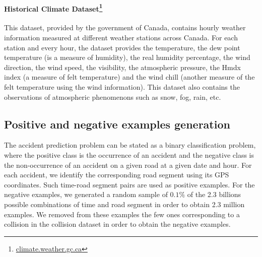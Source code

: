 \documentclass[conference]{IEEEtran}
\begin{document}
\paragraph{Historical Climate Dataset\protect\footnote{\url{climate.weather.gc.ca}}}

This dataset, provided by the government of Canada, contains hourly weather
information measured at different weather stations across Canada. For each
station and every hour, the dataset provides the temperature, the dew point
temperature (is a measure of humidity), the real humidity percentage,
the wind direction, the wind speed, the visibility, the atmospheric pressure,
the Hmdx index (a measure of felt temperature) and the wind chill 
 (another measure of the felt temperature using the wind information).
This dataset also contains the observations of atmospheric phenomenons such
as snow, fog, rain, etc.

\subsection{Positive and negative examples generation}

The accident prediction problem can be stated as a binary classification
problem, where the positive class is the occurrence of an accident and the
negative class is the non-occurrence of an accident on a given road at a
given date and hour. For each accident, we identify the
corresponding road segment using its GPS coordinates. Such time-road segment pairs are used as
positive examples. For the negative examples, we generated a random sample
of $0.1\%$ of the 2.3 billions possible combinations of time and road segment
in order to obtain 2.3 million examples. We removed from these examples the few
ones corresponding to a collision in the collision dataset in order to obtain
the negative examples.
\end{document}
